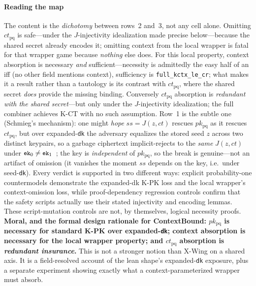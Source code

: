 \documentclass[journal]{IEEEtran}
\newcommand{\code}[1]{\texttt{\small #1}}
\begin{document}
\paragraph*{Reading the map} The content is the \emph{dichotomy} between rows~2 and~3, not any cell
alone. Omitting $ct_{\mathrm{pq}}$ is safe---under the $J$-injectivity idealization made precise
below---because the shared secret already encodes it; omitting context from the local wrapper is
fatal for that wrapper game because \emph{nothing} else does. For this local property, context
absorption is necessary \emph{and} sufficient---necessity is admittedly the easy half of an iff
(no other field mentions context),
sufficiency is \code{full\_kctx\_le\_cr}; what makes it a result rather than a tautology is its
contrast with $ct_{\mathrm{pq}}$, where the shared secret \emph{does} provide the missing binding.
Conversely $ct_{\mathrm{pq}}$ absorption is \emph{redundant with the shared secret}---but only under
the $J$-injectivity idealization; the full combiner achieves \mbox{K-CT} with no such assumption.
Row~1 is the subtle one (Schmieg's mechanism): one might \emph{hope} $ss=J(z,ct)$ rescues
$pk_{\mathrm{pq}}$ as it rescues $ct_{\mathrm{pq}}$, but over expanded-\code{dk} the adversary
equalizes the stored seed $z$ across two distinct keypairs, so a garbage ciphertext implicit-rejects
to the \emph{same} $J(z,ct)$ under $\code{ek}_0\neq\code{ek}_1$~\cite{schmieg}; the key is
\emph{independent} of $pk_{\mathrm{pq}}$, so the break is genuine---not an artifact of omission (it
vanishes the moment $ss$ depends on the key, i.e.\ under seed-\code{dk}). Every verdict is
supported in two different ways: explicit probability-one countermodels demonstrate the expanded-dk
K-PK loss and the local wrapper's context-omission loss, while proof-dependency regression controls confirm that the safety scripts actually use
their stated injectivity and encoding lemmas. These script-mutation controls are not, by themselves,
logical necessity proofs. \textbf{Moral, and the formal design rationale for ContextBound:
$pk_{\mathrm{pq}}$ is necessary for standard K-PK over expanded-\code{dk}; context absorption is
necessary for the local wrapper property; and $ct_{\mathrm{pq}}$ absorption is \emph{redundant
insurance}.} This is not a stronger notion than
X-Wing on a shared axis. It is a field-resolved account of the lean shape's expanded-\code{dk}
exposure, plus a separate experiment showing exactly what a context-parameterized wrapper must absorb.
\end{document}
